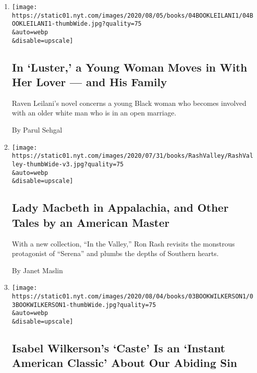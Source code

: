 \begin{enumerate}
\def\labelenumi{\arabic{enumi}.}
\item
  \href{/2020/08/04/books/review-luster-raven-leilani.html}{}

  \texttt{[image: https://static01.nyt.com/images/2020/08/05/books/04BOOKLEILANI1/04BOOKLEILANI1-thumbWide.jpg?quality=75\\\&auto=webp\\\&disable=upscale]}

  \hypertarget{in-luster-a-young-woman-moves-in-with-her-lover--and-his-family}{%
  \subsection{In `Luster,' a Young Woman Moves in With Her Lover --- and
  His
  Family}\label{in-luster-a-young-woman-moves-in-with-her-lover--and-his-family}}

  Raven Leilani's novel concerns a young Black woman who becomes
  involved with an older white man who is in an open marriage.

  By Parul Sehgal
\item
  \href{/2020/08/02/books/ron-rash-in-valley-serena.html}{}

  \texttt{[image: https://static01.nyt.com/images/2020/07/31/books/RashValley/RashValley-thumbWide-v3.jpg?quality=75\\\&auto=webp\\\&disable=upscale]}

  \hypertarget{lady-macbeth-in-appalachia-and-other-tales-by-an-american-master}{%
  \subsection{Lady Macbeth in Appalachia, and Other Tales by an American
  Master}\label{lady-macbeth-in-appalachia-and-other-tales-by-an-american-master}}

  With a new collection, ``In the Valley,'' Ron Rash revisits the
  monstrous protagonist of ``Serena'' and plumbs the depths of Southern
  hearts.

  By Janet Maslin
\item
  \href{/2020/07/31/books/review-caste-isabel-wilkerson-origins-of-our-discontents.html}{}

  \texttt{[image: https://static01.nyt.com/images/2020/08/04/books/03BOOKWILKERSON1/03BOOKWILKERSON1-thumbWide.jpg?quality=75\\\&auto=webp\\\&disable=upscale]}

  \hypertarget{isabel-wilkersons-caste-is-an-instant-american-classic-about-our-abiding-sin}{%
  \subsection{Isabel Wilkerson's `Caste' Is an `Instant American
  Classic' About Our Abiding
  Sin}\label{isabel-wilkersons-caste-is-an-instant-american-classic-about-our-abiding-sin}}


\end{enumerate}
